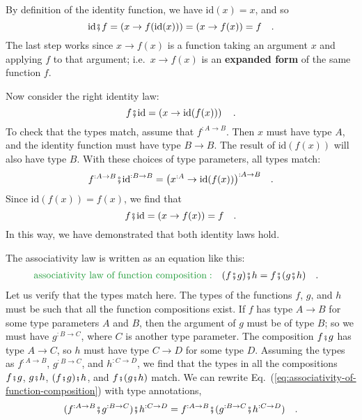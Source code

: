 By definition of the identity function, we have $\text{id}(x)=x$,
and so 
\[
\text{id}\bef f=\left(x\rightarrow f(\text{id}(x))\right)=\left(x\rightarrow f(x)\right)=f\quad.
\]
The last step works since $x\rightarrow f(x)$ is a function taking
an argument $x$ and applying $f$ to that argument; i.e.~$x\rightarrow f(x)$
is an \textbf{expanded form} of
the same function $f$.

Now consider the right identity law:
\[
f\bef\text{id}=\left(x\rightarrow\text{id}(f(x))\right)\quad.
\]
To check that the types match, assume that $f^{:A\rightarrow B}$.
Then $x$ must have type $A$, and the identity function must have
type $B\rightarrow B$. The result of $\text{id}(f(x))$ will also
have type $B$. With these choices of type parameters, all types match:
\[
f^{:A\rightarrow B}\bef\text{id}^{:B\rightarrow B}=\big(x^{:A}\rightarrow\text{id}(f(x))\big)^{:A\rightarrow B}\quad.
\]
Since $\text{id}(f(x))=f(x)$, we find that 
\[
f\bef\text{id}=\left(x\rightarrow f(x)\right)=f\quad.
\]
In this way, we have demonstrated that both identity laws hold. 

The associativity law is written as an equation like this:
\begin{align}
{\color{greenunder}\text{associativity law of function composition}:}\quad & (f\bef g)\bef h=f\bef(g\bef h)\quad.\label{eq:associativity-of-function-composition}
\end{align}
Let us verify that the types match here. The types of the functions
$f$, $g$, and $h$ must be such that all the function compositions
exist. If $f$ has type $A\rightarrow B$ for some type parameters
$A$ and $B$, then the argument of $g$ must be of type $B$; so
we must have $g^{:B\rightarrow C}$, where $C$ is another type parameter.
The composition $f\bef g$ has type $A\rightarrow C$, so $h$ must
have type $C\rightarrow D$ for some type $D$. Assuming the types
as $f^{:A\rightarrow B}$, $g^{:B\rightarrow C}$, and $h^{:C\rightarrow D}$,
we find that the types in all the compositions $f\bef g$, $g\bef h$,
$(f\bef g)\bef h$, and $f\bef(g\bef h)$ match. We can rewrite Eq.~(\ref{eq:associativity-of-function-composition})
with type annotations, 
\begin{equation}
(f^{:A\rightarrow B}\bef g^{:B\rightarrow C})\bef h^{:C\rightarrow D}=f^{:A\rightarrow B}\bef(g^{:B\rightarrow C}\bef h^{:C\rightarrow D})\quad.\label{eq:associativity-law-for-function-composition-with-types}
\end{equation}

